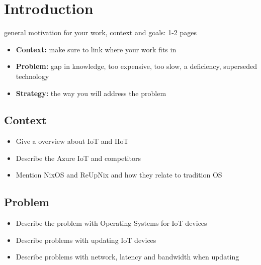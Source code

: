 \chapter{Introduction}
\label{sec:introduction}

\begin{tcolorbox}[title=TODO]
general motivation for your work, context and goals: 1-2 pages

\begin{itemize}
\item \textbf{Context:} make sure to link where your work fits in
\item \textbf{Problem:} gap in knowledge, too expensive, too slow, a deficiency, superseded technology
\item \textbf{Strategy:} the way you will address the problem
\end{itemize}
\end{tcolorbox}

\section{Context}
\begin{tcolorbox}[title=TODO]
    \begin{itemize}
        \item Give a overview about IoT and IIoT
        \item Describe the Azure IoT and competitors
        \item Mention NixOS and ReUpNix and how they relate to tradition OS
    \end{itemize}
\end{tcolorbox}

\section{Problem}
\begin{tcolorbox}[title=TODO]
    \begin{itemize}
        \item Describe the problem with Operating Systems for IoT devices
        \item Describe problems with updating IoT devices
        \item Describe problems with network, latency and bandwidth when updating
    \end{itemize}
\end{tcolorbox}

